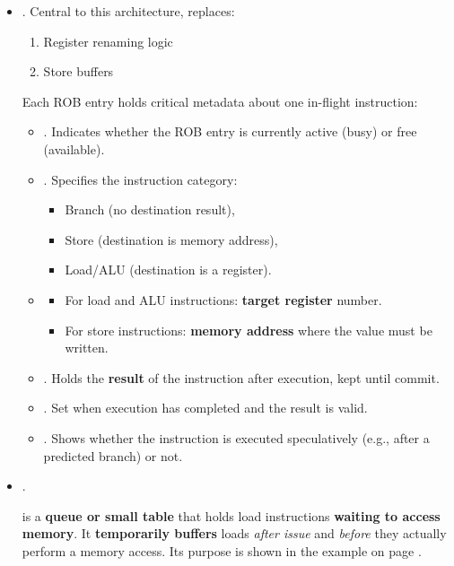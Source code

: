 \begin{itemize}
    \item {}. Central to this architecture, replaces:
    \begin{enumerate}
        \item Register renaming logic
        \item Store buffers
    \end{enumerate}
    Each ROB entry holds critical metadata about one in-flight instruction:
    \begin{itemize}
        \item {}. Indicates whether the ROB entry is currently active (busy) or free (available).
        \item {}. Specifies the instruction category:
        \begin{itemize}
            \item Branch (no destination result),
            \item Store (destination is memory address),
            \item Load/ALU (destination is a register).
        \end{itemize}
        \item {}
        \begin{itemize}
            \item For load and ALU instructions: \textbf{target register} number.
            \item For store instructions: \textbf{memory address} where the value must be written.
        \end{itemize}
        \item {}. Holds the \textbf{result} of the instruction after execution, kept until commit.
        \item {}. Set when execution has completed and the result is valid.
        \item {}. Shows whether the instruction is executed speculatively (e.g., after a predicted branch) or not.
    \end{itemize}

    \item {}.

     is a \textbf{queue or small table} that holds load instructions \textbf{waiting to access memory}. It \textbf{temporarily buffers} loads \emph{after issue} and \emph{before} they actually perform a memory access. Its purpose is shown in the example on page \pageref{paragraph: Tomasulo Loop Execution}.


\end{itemize}
